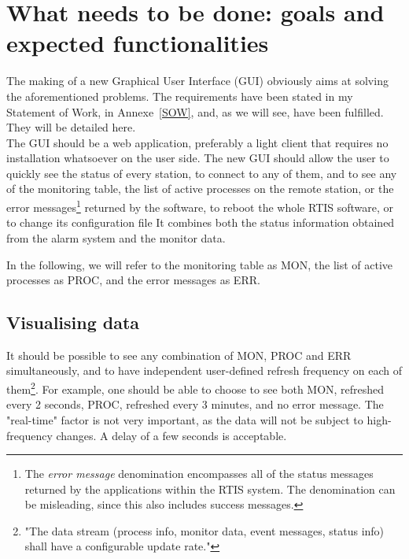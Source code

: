 \documentclass{themeensg}
\begin{document}

\section{What needs to be done: goals and expected functionalities}

The making of a new Graphical User Interface (GUI) obviously aims at solving the aforementioned problems. The requirements have been stated in my Statement of Work, in Annexe~\ref{SOW}, and, as we will see, have been fulfilled. They will be detailed here. \\


The GUI should be a web application, preferably a light client that requires no installation whatsoever on the user side. The new GUI should allow the user to quickly see the status of every station, to connect to any of them, and to see any of the monitoring table, the list of active processes on the remote station, or the error messages\footnote{The \textit{error message} denomination encompasses all of the status messages returned by the applications within the RTIS system. The denomination can be misleading, since this also includes success messages.} returned by the software, to reboot the whole RTIS software, or to change its configuration file It combines both the status information obtained from the alarm system and the monitor data. 

In the following, we will refer to the monitoring table as MON, the list of active processes as PROC, and the error messages as ERR.\\

\subsection{Visualising data}

It should be possible to see any combination of MON, PROC and ERR simultaneously, and to have independent user-defined refresh frequency on each of them\footnote{"The data stream (process info, monitor data, event messages, status info) shall have a configurable update rate."}. For example, one should be able to choose to see both MON, refreshed every 2 seconds, PROC, refreshed every 3 minutes, and no error message. The "real-time" factor is not very important, as the data will not be subject to high-frequency changes. A delay of a few seconds is acceptable.\\
\end{document}
